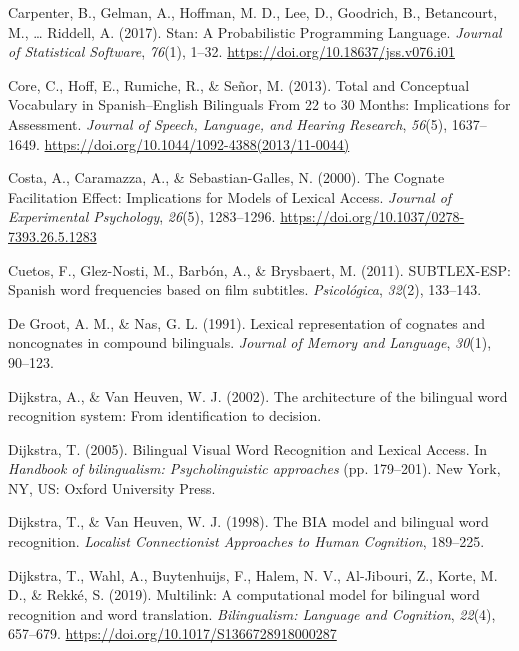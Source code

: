 \documentclass[english,man,man,floatsintext]{apa6}
\begin{document}
\leavevmode\hypertarget{ref-carpenter2017}{}%
Carpenter, B., Gelman, A., Hoffman, M. D., Lee, D., Goodrich, B., Betancourt, M., \ldots{} Riddell, A. (2017). Stan: A Probabilistic Programming Language. \emph{Journal of Statistical Software}, \emph{76}(1), 1--32. \url{https://doi.org/10.18637/jss.v076.i01}

\leavevmode\hypertarget{ref-core2013}{}%
Core, C., Hoff, E., Rumiche, R., \& Señor, M. (2013). Total and Conceptual Vocabulary in Spanish--English Bilinguals From 22 to 30 Months: Implications for Assessment. \emph{Journal of Speech, Language, and Hearing Research}, \emph{56}(5), 1637--1649. \url{https://doi.org/10.1044/1092-4388(2013/11-0044)}

\leavevmode\hypertarget{ref-costa2000}{}%
Costa, A., Caramazza, A., \& Sebastian-Galles, N. (2000). The Cognate Facilitation Effect: Implications for Models of Lexical Access. \emph{Journal of Experimental Psychology}, \emph{26}(5), 1283--1296. \url{https://doi.org/10.1037/0278-7393.26.5.1283}

\leavevmode\hypertarget{ref-cuetos2011}{}%
Cuetos, F., Glez-Nosti, M., Barbón, A., \& Brysbaert, M. (2011). SUBTLEX-ESP: Spanish word frequencies based on film subtitles. \emph{Psicológica}, \emph{32}(2), 133--143.

\leavevmode\hypertarget{ref-de1991lexical}{}%
De Groot, A. M., \& Nas, G. L. (1991). Lexical representation of cognates and noncognates in compound bilinguals. \emph{Journal of Memory and Language}, \emph{30}(1), 90--123.

\leavevmode\hypertarget{ref-dijkstra2002architecture}{}%
Dijkstra, A., \& Van Heuven, W. J. (2002). The architecture of the bilingual word recognition system: From identification to decision.

\leavevmode\hypertarget{ref-dijkstra2005}{}%
Dijkstra, T. (2005). Bilingual Visual Word Recognition and Lexical Access. In \emph{Handbook of bilingualism: Psycholinguistic approaches} (pp. 179--201). New York, NY, US: Oxford University Press.

\leavevmode\hypertarget{ref-dijkstra1998bia}{}%
Dijkstra, T., \& Van Heuven, W. J. (1998). The BIA model and bilingual word recognition. \emph{Localist Connectionist Approaches to Human Cognition}, 189--225.

\leavevmode\hypertarget{ref-dijkstra2019}{}%
Dijkstra, T., Wahl, A., Buytenhuijs, F., Halem, N. V., Al-Jibouri, Z., Korte, M. D., \& Rekké, S. (2019). Multilink: A computational model for bilingual word recognition and word translation. \emph{Bilingualism: Language and Cognition}, \emph{22}(4), 657--679. \url{https://doi.org/10.1017/S1366728918000287}
\end{document}
